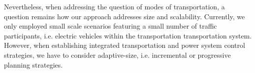 Nevertheless, when addressing the question of modes of transportation, a question remains how our approach addresses size and scalability. Currently, we only employed small scale scenarios featuring a small number of traffic participants, i.e. electric vehicles within the transportation transportation system. However, when establishing integrated transportation and power system control strategies, we have to consider adaptive-size, i.e. incremental or progressive planning strategies.
